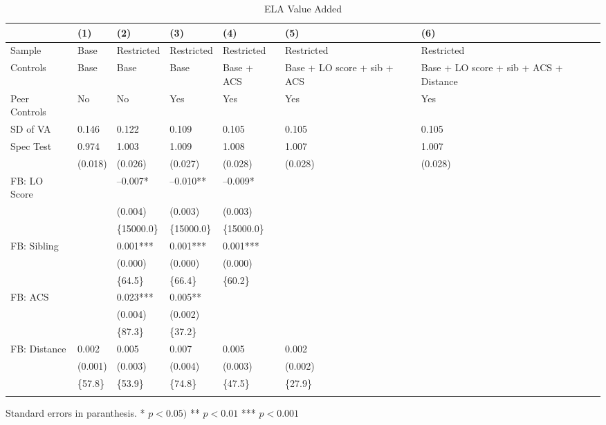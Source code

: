 \begin{table}[tbp] \centering
{}

\caption{ELA Value Added}
{\footnotesize
\begin{tabularx}{\linewidth}{lCCCCCC}

\toprule
&{(1)}&{(2)}&{(3)}&{(4)}&{(5)}&{(6)} \tabularnewline
\midrule \addlinespace[\belowrulesep]
Sample&Base&Restricted&Restricted&Restricted&Restricted&Restricted \tabularnewline
Controls&Base&Base&Base&Base + ACS&Base + LO score + sib + ACS&Base + LO score + sib + ACS + Distance \tabularnewline
Peer Controls&No&No&Yes&Yes&Yes&Yes \tabularnewline
\midrule SD of VA&0.146&0.122&0.109&0.105&0.105&0.105 \tabularnewline
Spec Test&0.974&1.003&1.009&1.008&1.007&1.007 \tabularnewline
&(0.018)&(0.026)&(0.027)&(0.028)&(0.028)&(0.028) \tabularnewline
FB: LO Score&&--0.007*&--0.010**&--0.009*&& \tabularnewline
&&(0.004)&(0.003)&(0.003)&& \tabularnewline
&&\{15000.0\}&\{15000.0\}&\{15000.0\}&& \tabularnewline
FB: Sibling&&0.001***&0.001***&0.001***&& \tabularnewline
&&(0.000)&(0.000)&(0.000)&& \tabularnewline
&&\{64.5\}&\{66.4\}&\{60.2\}&& \tabularnewline
FB: ACS&&0.023***&0.005**&&& \tabularnewline
&&(0.004)&(0.002)&&& \tabularnewline
&&\{87.3\}&\{37.2\}&&& \tabularnewline
FB: Distance&0.002&0.005&0.007&0.005&0.002& \tabularnewline
&(0.001)&(0.003)&(0.004)&(0.003)&(0.002)& \tabularnewline
&\{57.8\}&\{53.9\}&\{74.8\}&\{47.5\}&\{27.9\}& \tabularnewline
\bottomrule \addlinespace[\belowrulesep]

\end{tabularx}
\begin{flushleft}
\footnotesize Standard errors in paranthesis. * \(p<0.05)\) ** \(p<0.01\) *** \(p<0.001\)
\end{flushleft}
}
\end{table}
